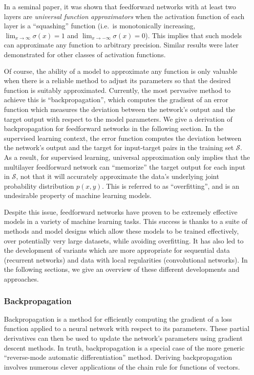 In a seminal paper, it was shown that feedforward networks with at least two layers are {\em universal function approximators} when the activation function of each layer is a ``squashing'' function (i.e.\ is monotonically increasing, $\lim_{x \rightarrow \infty} \sigma(x) = 1$ and $\lim_{x \rightarrow -\infty} \sigma(x) = 0$).
This implies that such models can approximate any function to arbitrary precision.
Similar results were later demonstrated for other classes of activation functions.

Of course, the ability of a model to approximate any function is only valuable when there is a reliable method to adjust its parameters so that the desired function is suitably approximated.
Currently, the most pervasive method to achieve this is ``backpropagation'', which computes the gradient of an error function which measures the deviation between the network's output and the target output with respect to the model parameters.
We give a derivation of backpropagation for feedforward networks in the following section.
In the supervised learning context, the error function computes the deviation between the network's output and the target for input-target pairs in the training set $\mathcal{S}$.
As a result, for supervised learning, universal approximation only implies that the multilayer feedforward network can ``memorize'' the target output for each input in $\mathcal{S}$, not that it will accurately approximate the data's underlying joint probability distribution $p(x, y)$.
This is referred to as ``overfitting'', and is an undesirable property of machine learning models.

Despite this issue, feedforward networks have proven to be extremely effective models in a variety of machine learning tasks.
This success is thanks to a suite of methods and model designs which allow these models to be trained effectively, over potentially very large datasets, while avoiding overfitting.
It has also led to the development of variants which are more appropriate for sequential data (recurrent networks) and data with local regularities (convolutional networks).
In the following sections, we give an overview of these different developments and approaches.

\subsubsection{Backpropagation}

Backpropagation is a method for efficiently computing the gradient of a loss function applied to a neural network with respect to its parameters.
These partial derivatives can then be used to update the network's parameters using gradient descent methods.
In truth, backpropagation is a special case of the more generic ``reverse-mode automatic differentiation'' method.
Deriving backpropagation involves numerous clever applications of the chain rule for functions of vectors.

